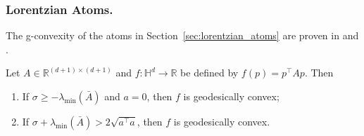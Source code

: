 \documentclass[twoside,11pt]{article}
\begin{document}
\subsubsection{Lorentzian Atoms.}
The g-convexity of the atoms in Section~\ref{sec:lorentzian_atoms} are proven in \cite{Ferreira2022} and \cite{Ferreira2023_nonhomogeneous}. 




\begin{theorem}\label{theorem:special_cases_hom}
Let $A \in \mathbb{R}^{(d+1) \times(d+1)}$ and $f: \mathbb{H}^d \rightarrow \mathbb{R}$ be defined by $f(p)=p^{\top} A p$. Then

\begin{enumerate}
\item  If $\sigma \geq-\lambda_{\min }(\bar{A})$ and $a=0$, then $f$ is geodesically convex;
\item  If $\sigma+\lambda_{\min }(\bar{A})>2 \sqrt{a^{\top} a}$, then $f$ is geodesically convex.
\end{enumerate}

\end{theorem}
\end{document}
